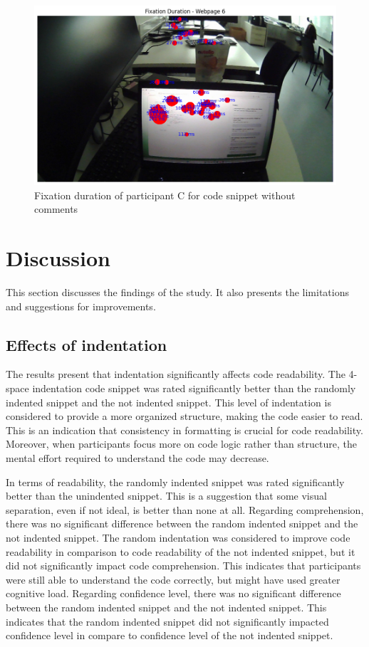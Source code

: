\begin{figure} [H]
  \centering
  \includegraphics[scale=0.6]{figures/0-com.png}
  \caption{Fixation duration of  participant C for code snippet without comments}
  \label{fig:AnhangsChor}
\end{figure}





\chapter{Discussion}
This section discusses the findings of the study. It also presents the limitations and suggestions for improvements.


\section{Effects of indentation} 
The results present that indentation significantly affects code readability. The 4-space indentation code snippet was rated significantly better than the randomly indented snippet and the not indented snippet. This level of indentation is considered to provide a more organized structure, making the code easier to read. This is an indication that consistency in formatting is crucial for code readability. Moreover, when participants focus more on code logic rather than structure, the mental effort required to understand the code may decrease.


In terms of readability, the randomly indented snippet was rated significantly better than the unindented snippet. This is a suggestion that some visual separation, even if not ideal, is better than none at all.  Regarding comprehension, there was no significant difference between the random indented snippet and the not indented snippet. The random indentation was considered to improve code readability in comparison to code readability of the not indented snippet, but it did not significantly impact code comprehension.  This indicates that participants were still able to understand the code correctly, but might have used greater cognitive load. Regarding confidence level, there was no significant difference between the random indented snippet and the not indented snippet. This indicates that the random indented snippet did not significantly impacted confidence level in compare to confidence level of the not indented snippet. 

